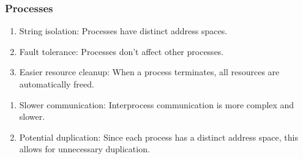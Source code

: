 \documentclass{report}
\begin{document}
\subsubsection*{Processes}
\begin{tcbraster}[raster columns=2, raster equal height, raster force size=false]
  \begin{tcolorbox}[colback=green!5!white,colframe=black!75!green,title=Advantages]
    \begin{enumerate}[label=\textit{(\roman*)}]
    \item String isolation: Processes have distinct address spaces.
    \item Fault tolerance: Processes don't affect other processes.
    \item Easier resource cleanup: When a process terminates, all resources are automatically freed.
    \end{enumerate}
  \end{tcolorbox}
  \begin{tcolorbox}[colback=red!5!white,colframe=black!40!red,title=Disadvantages]
    \begin{enumerate}[label=\textit{(\roman*)}]
    \item Slower communication: Interprocess communication is more complex and slower.
    \item Potential duplication: Since each process has a distinct address space, this allows for
      unnecessary duplication.
    \end{enumerate}
  \end{tcolorbox}
\end{tcbraster}
\end{document}
